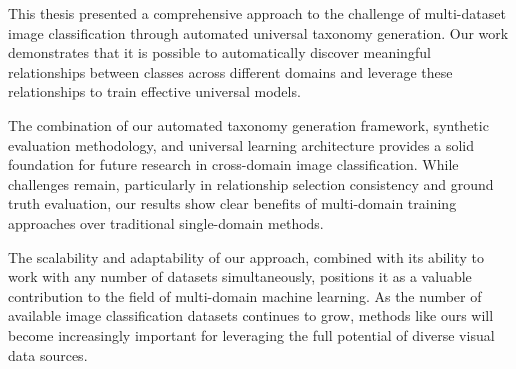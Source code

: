 This thesis presented a comprehensive approach to the challenge of multi-dataset image classification
through automated universal taxonomy generation.
Our work demonstrates that it is possible to automatically discover
meaningful relationships between classes across different domains
and leverage these relationships to train effective universal models.

The combination of our automated taxonomy generation framework,
synthetic evaluation methodology,
and universal learning architecture provides a solid foundation
for future research in cross-domain image classification.
While challenges remain, particularly in relationship selection consistency
and ground truth evaluation,
our results show clear benefits of multi-domain training approaches
over traditional single-domain methods.

The scalability and adaptability of our approach,
combined with its ability to work with any number of datasets simultaneously,
positions it as a valuable contribution to the field of multi-domain machine learning.
As the number of available image classification datasets continues to grow,
methods like ours will become increasingly important
for leveraging the full potential of diverse visual data sources.

